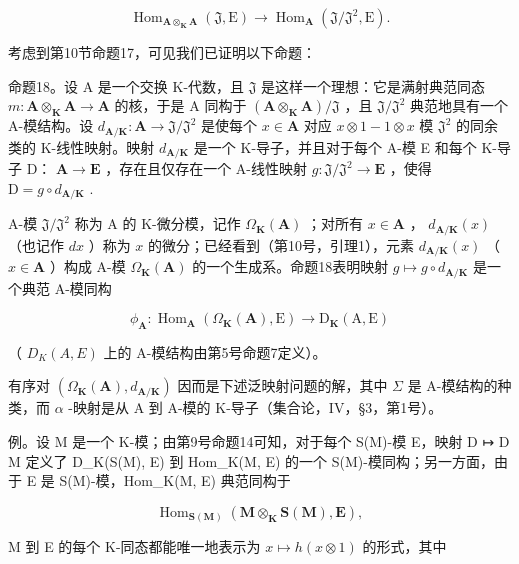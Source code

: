 \[
\operatorname{Hom} _ {\mathbf {A} \otimes_ {\mathbf {K}} \mathbf {A}} (\mathfrak{J} , \mathrm{E}) \rightarrow \operatorname{Hom} _ {\mathbf {A}} (\mathfrak{J} / \mathfrak{J}^ {2}, \mathrm{E}).
\]

考虑到第10节命题17，可见我们已证明以下命题：

命题18。设 A 是一个交换 K-代数，且 \(\mathfrak{J}\) 是这样一个理想：它是满射典范同态 \(m: \mathbf{A} \otimes_{\mathbf{K}} \mathbf{A} \to \mathbf{A}\) 的核，于是 A 同构于 \((\mathbf{A} \otimes_{\mathbf{K}} \mathbf{A}) / \mathfrak{J}\) ，且 \(\mathfrak{J} / \mathfrak{J}^2\) 典范地具有一个 A-模结构。设 \(d_{\mathbf{A} / \mathbf{K}}: \mathbf{A} \to \mathfrak{J} / \mathfrak{J}^2\) 是使每个 \(x \in \mathbf{A}\) 对应 \(x \otimes 1 - 1 \otimes x\) 模 \(\mathfrak{J}^2\) 的同余类的 K-线性映射。映射 \(d_{\mathbf{A} / \mathbf{K}}\) 是一个 K-导子，并且对于每个 A-模 E 和每个 K-导子 D： \(\mathbf{A} \to \mathbf{E}\) ，存在且仅存在一个 A-线性映射 \(g: \mathfrak{J} / \mathfrak{J}^2 \to \mathbf{E}\) ，使得 \(\mathrm{D} = g \circ d_{\mathbf{A} / \mathbf{K}}\) .

A-模 \(\mathfrak{J} / \mathfrak{J}^2\) 称为 A 的 K-微分模，记作 \(\Omega_{\mathbf{K}}(\mathbf{A})\) ；对所有 \(x \in \mathbf{A}\) ， \(d_{\mathbf{A} / \mathbf{K}}(x)\) （也记作 \(dx\) ）称为 \(x\) 的微分；已经看到（第10号，引理1），元素 \(d_{\mathbf{A} / \mathbf{K}}(x)\) （ \(x \in \mathbf{A}\) ）构成 A-模 \(\Omega_{\mathbf{K}}(\mathbf{A})\) 的一个生成系。命题18表明映射 \(g \mapsto g \circ d_{\mathbf{A} / \mathbf{K}}\) 是一个典范 A-模同构

\[
\phi_ {\mathbf {A}}: \operatorname{Hom} _ {\mathbf {A}} (\Omega_ {\mathbf {K}} (\mathbf {A}), \mathrm{E}) \rightarrow \mathrm{D} _ {\mathbf {K}} (\mathrm{A}, \mathrm{E})
\]

（ \(D_{K}(A, E)\) 上的 A-模结构由第5号命题7定义）。

有序对 \((\Omega_{\mathbf{K}}(\mathbf{A}), d_{\mathbf{A}/\mathbf{K}})\) 因而是下述泛映射问题的解，其中 \(\Sigma\) 是 A-模结构的种类，而 \(\alpha\) -映射是从 A 到 A-模的 K-导子（集合论，IV，§3，第1号）。

例。设 M 是一个 K-模；由第9号命题14可知，对于每个 S(M)-模 E，映射 D ↦ D \textbar{} M 定义了 D\_K(S(M), E) 到 Hom\_K(M, E) 的一个 S(M)-模同构；另一方面，由于 E 是 S(M)-模，Hom\_K(M, E) 典范同构于

\[
\operatorname{Hom} _ {\mathbf {S} (\mathbf {M})} (\mathbf {M} \otimes_ {\mathbf {K}} \mathbf {S} (\mathbf {M}), \mathbf {E}),
\]

M 到 E 的每个 K-同态都能唯一地表示为 \(x \mapsto h(x \otimes 1)\) 的形式，其中

